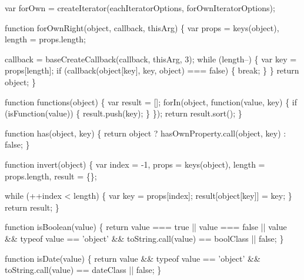 \begin{DoxyCodeInclude}
    var forOwn = createIterator(eachIteratorOptions, forOwnIteratorOptions);

    \textcolor{keyword}{function} forOwnRight(\textcolor{keywordtype}{object}, callback, thisArg) \{
      var props = keys(\textcolor{keywordtype}{object}),
          length = props.length;

      callback = baseCreateCallback(callback, thisArg, 3);
      \textcolor{keywordflow}{while} (length--) \{
        var key = props[length];
        \textcolor{keywordflow}{if} (callback(\textcolor{keywordtype}{object}[key], key, \textcolor{keywordtype}{object}) === \textcolor{keyword}{false}) \{
          \textcolor{keywordflow}{break};
        \}
      \}
      \textcolor{keywordflow}{return} object;
    \}

    \textcolor{keyword}{function} functions(\textcolor{keywordtype}{object}) \{
      var result = [];
      forIn(\textcolor{keywordtype}{object}, \textcolor{keyword}{function}(value, key) \{
        \textcolor{keywordflow}{if} (isFunction(value)) \{
          result.push(key);
        \}
      \});
      \textcolor{keywordflow}{return} result.sort();
    \}

    \textcolor{keyword}{function} has(\textcolor{keywordtype}{object}, key) \{
      \textcolor{keywordflow}{return} \textcolor{keywordtype}{object} ? hasOwnProperty.call(\textcolor{keywordtype}{object}, key) : \textcolor{keyword}{false};
    \}

    \textcolor{keyword}{function} invert(\textcolor{keywordtype}{object}) \{
      var index = -1,
          props = keys(\textcolor{keywordtype}{object}),
          length = props.length,
          result = \{\};

      \textcolor{keywordflow}{while} (++index < length) \{
        var key = props[index];
        result[\textcolor{keywordtype}{object}[key]] = key;
      \}
      \textcolor{keywordflow}{return} result;
    \}

    \textcolor{keyword}{function} isBoolean(value) \{
      \textcolor{keywordflow}{return} value === \textcolor{keyword}{true} || value === \textcolor{keyword}{false} ||
        value && typeof value == \textcolor{stringliteral}{'object'} && toString.call(value) == boolClass || \textcolor{keyword}{false};
    \}

    \textcolor{keyword}{function} isDate(value) \{
      \textcolor{keywordflow}{return} value && typeof value == \textcolor{stringliteral}{'object'} && toString.call(value) == dateClass || \textcolor{keyword}{false};
    \}


\end{DoxyCodeInclude}
